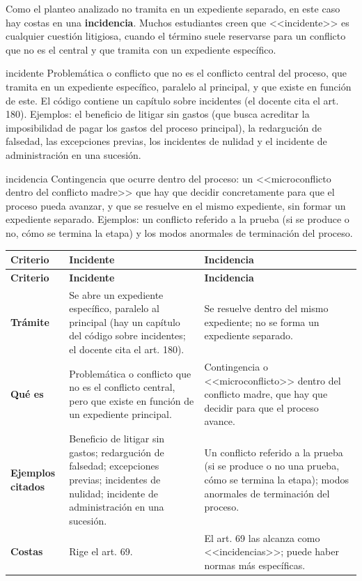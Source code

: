 \documentclass[12pt,oneside]{book}
\begin{document}
Como el planteo analizado no tramita en un expediente separado, en este caso hay costas en una \textbf{incidencia}. Muchos estudiantes creen que <<incidente>> es cualquier cuestión litigiosa, cuando el término suele reservarse para un conflicto que no es el central y que tramita con un expediente específico.

\begin{definition}{incidente}
Problemática o conflicto que no es el conflicto central del proceso, que tramita en un expediente específico, paralelo al principal, y que existe en función de este. El código contiene un capítulo sobre incidentes (el docente cita el art. 180). Ejemplos: el beneficio de litigar sin gastos (que busca acreditar la imposibilidad de pagar los gastos del proceso principal), la redargución de falsedad, las excepciones previas, los incidentes de nulidad y el incidente de administración en una sucesión.
\end{definition}

\begin{definition}{incidencia}
Contingencia que ocurre dentro del proceso: un <<microconflicto dentro del conflicto madre>> que hay que decidir concretamente para que el proceso pueda avanzar, y que se resuelve en el mismo expediente, sin formar un expediente separado. Ejemplos: un conflicto referido a la prueba (si se produce o no, cómo se termina la etapa) y los modos anormales de terminación del proceso.
\end{definition}

\begin{longtable}{@{}L{0.16\textwidth}L{0.36\textwidth}L{0.38\textwidth}@{}}
\toprule
\textbf{Criterio} & \textbf{Incidente} & \textbf{Incidencia} \\
\midrule
\endfirsthead
\toprule
\textbf{Criterio} & \textbf{Incidente} & \textbf{Incidencia} \\
\midrule
\endhead
\bottomrule
\endlastfoot
\textbf{Trámite} & Se abre un expediente específico, paralelo al principal (hay un capítulo del código sobre incidentes; el docente cita el art. 180). & Se resuelve dentro del mismo expediente; no se forma un expediente separado. \\
\textbf{Qué es} & Problemática o conflicto que no es el conflicto central, pero que existe en función de un expediente principal. & Contingencia o <<microconflicto>> dentro del conflicto madre, que hay que decidir para que el proceso avance. \\
\textbf{Ejemplos citados} & Beneficio de litigar sin gastos; redargución de falsedad; excepciones previas; incidentes de nulidad; incidente de administración en una sucesión. & Un conflicto referido a la prueba (si se produce o no una prueba, cómo se termina la etapa); modos anormales de terminación del proceso. \\
\textbf{Costas} & Rige el art. 69. & El art. 69 las alcanza como <<incidencias>>; puede haber normas más específicas. \\
\end{longtable}
\end{document}
